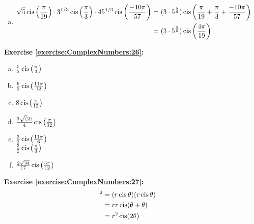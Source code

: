 \begin{enumerate}[(a)]
\item 
\begin{align*}
\sqrt{5}\operatorname{cis}\left(\frac{\pi}{19}\right)\cdot 3^{1/3} \operatorname{cis}\left(\frac{\pi}{3}\right)\cdot 45^{1/3}\operatorname{cis}\left(\frac{-10\pi}{57}\right) &= (3 \cdot 5^{\frac{5}{6}})\operatorname{cis}\left(\frac{\pi}{19} + \frac{\pi}{3} + \frac{-10\pi}{57}\right)\\
&= (3 \cdot 5^{\frac{5}{6}})\operatorname{cis}\left(\frac{4\pi}{19}\right)\\
\end{align*}
\end{enumerate}

\noindent\textbf{Exercise \ref{exercise:ComplexNumbers:26}:} %
\begin{multicols}{2}
\begin{enumerate}[(a)]
\item 
$\frac{5}{2}\operatorname{cis}\left(\frac{\pi}{3}\right)$

\item
$\frac{9}{2}\operatorname{cis}\left(\frac{11\pi}{12}\right)$

\item
$8\operatorname{cis}\left(\frac{\pi}{12}\right)$
 
\item
$\frac{3\sqrt(2)}{4}\operatorname{cis}\left(\frac{\pi}{12}\right)$

\item %
$\frac{3}{2}\operatorname{cis}\left(\frac{11\pi}{6}\right)$\\
$\frac{3}{2}\operatorname{cis}\left(\frac{\pi}{3}\right)$ %

\item
$\frac{2\sqrt{34}}{17}\operatorname{cis}\left(\frac{5\pi}{12}\right)$
\end{enumerate}
\end{multicols}

\noindent\textbf{Exercise \ref{exercise:ComplexNumbers:27}:}
\begin{align*}
[r\cis\theta]^{2} & = (r\cis\theta)(r\cis\theta)\\
& = rr\cis(\theta+\theta)\\
& = r^{2}\cis(2\theta)
\end{align*}

